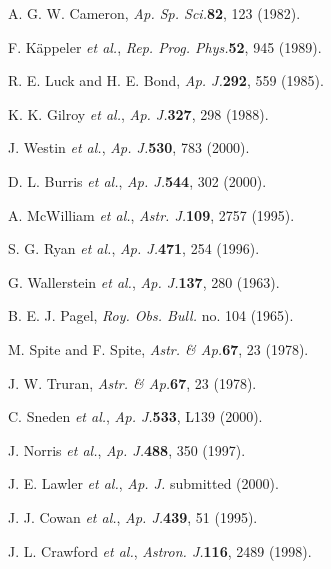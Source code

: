 \documentclass{ws-p8-50x6-00}
\begin{document}
\begin{thebibliography}{99}

A. G. W. Cameron, {\it Ap. Sp. Sci.}{\bf 82}, 123 (1982).

F. K{\"a}ppeler {\it et al.}, {\it Rep. Prog. Phys.}{\bf 52}, 945 (1989).

R. E. Luck and H. E. Bond, {\it Ap. J.}{\bf 292}, 559 (1985).

K. K. Gilroy {\it et al.}, {\it Ap. J.}{\bf 327}, 298 (1988).

J. Westin {\it et al.}, {\it Ap. J.}{\bf 530}, 783 (2000).

D. L. Burris {\it et al.}, {\it Ap. J.}{\bf 544}, 302 (2000).

A. McWilliam {\it et al.}, {\it Astr. J.}{\bf 109}, 2757 (1995).

S. G. Ryan {\it et al.}, {\it Ap. J.}{\bf 471}, 254 (1996).

G. Wallerstein {\it et al.}, {\it Ap. J.}{\bf 137}, 280 (1963).

B. E. J. Pagel, {\it Roy. Obs. Bull.} no. 104 (1965).

M. Spite and F. Spite, {\it Astr. \& Ap.}{\bf 67}, 23 (1978).

J. W. Truran, {\it Astr. \& Ap.}{\bf 67}, 23 (1978).

C. Sneden {\it et al.}, {\it Ap. J.}{\bf 533}, L139 (2000).

J. Norris {\it et al.}, {\it Ap. J.}{\bf 488}, 350 (1997).

J. E. Lawler {\it et al.}, {\it Ap. J.} submitted (2000).

J. J. Cowan {\it et al.}, {\it Ap. J.}{\bf 439}, 51 (1995).

J. L. Crawford {\it et al.}, {\it Astron. J.}{\bf 116}, 2489 (1998).

\end{thebibliography}
\end{document}
